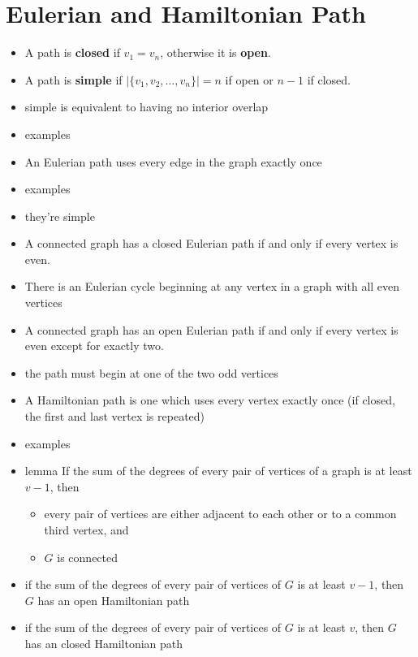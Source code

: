 \section{Eulerian and Hamiltonian Path}\label{sec:euler}


\begin{itemize}
    \item A path is \textbf{closed} if $v_1 = v_n$, otherwise it is \textbf{open}.
    \item A path is \textbf{simple} if $|\{v_1, v_2, \ldots, v_n\}| = n$ if open or $n-1$ if closed. %
    \item simple is equivalent to having no interior overlap
    \item examples
    \item An Eulerian path uses every edge in the graph exactly once
    \item examples
    \item they're simple
    \item A connected graph has a closed Eulerian path if and only if every vertex is even.
    \item There is an Eulerian cycle beginning at any vertex in a graph with all even vertices
    \item A connected graph has an open Eulerian path if and only if every vertex is even except for exactly two.
    \item the path must begin at one of the two odd vertices
    \item A Hamiltonian path is one which uses every vertex exactly once (if closed, the first and last vertex is repeated)
    \item examples
    \item lemma If the sum of the degrees of every pair of vertices of a graph is at least $v-1$, then
    \begin{itemize}
        \item every pair of vertices are either adjacent to each other or to a common third vertex, and
        \item $G$ is connected
    \end{itemize}
    \item if the sum of the degrees of every pair of vertices of $G$ is at least $v-1$, then $G$ has an open Hamiltonian path
    \item if the sum of the degrees of every pair of vertices of $G$ is at least $v$, then $G$ has an closed Hamiltonian path


\end{itemize}
